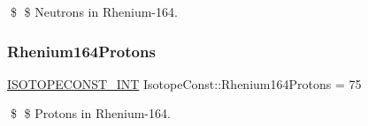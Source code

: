 \$ \$ Neutrons in Rhenium-\/164. \mbox{\label{group___isotope_const-_rhenium-_re164_ga8800765e88ab322ddcf1994c94bffe80}} 
\subsubsection{\texorpdfstring{Rhenium164\+Protons}{Rhenium164Protons}}
{\footnotesize\ttfamily \mbox{\hyperlink{group___isotope_const-_macros_ga5f18360b3e99483a35c32d789e62621c}{I\+S\+O\+T\+O\+P\+E\+C\+O\+N\+S\+T\+\_\+\+I\+NT}} Isotope\+Const\+::\+Rhenium164\+Protons = 75}

\$ \$ Protons in Rhenium-\/164. 